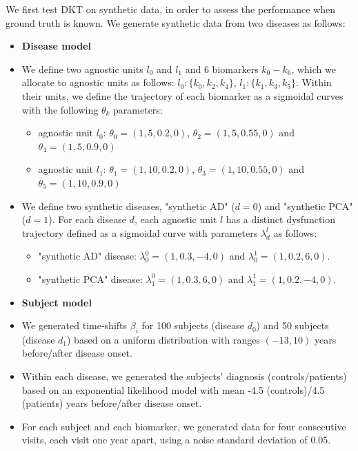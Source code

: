 \documentclass{llncs}
\begin{document}
We first test DKT on synthetic data, in order to assess the performance when ground truth is known. We generate synthetic data from two diseases as follows:
%
\begin{itemize}
 \item[] \textbf{Disease model}
 \item We define two agnostic units $l_0$ and $l_1$ and 6 biomarkers $k_0-k_6$, which we allocate to agnostic units as follows: $l_0:\{k_0, k_2, k_4\}$, $l_1: \{k_1, k_3, k_5\}$. Within their units, we define the trajectory of each biomarker as a sigmoidal curves with the following $\theta_k$ parameters:
 \begin{itemize}
  \item agnostic unit $l_0$: $\theta_0 = (1,5,0.2,0)$, $\theta_2 = (1,5,0.55,0)$ and $\theta_4 = (1,5,0.9,0)$ 
  \item agnostic unit $l_1$: $\theta_1 = (1,10,0.2,0)$, $\theta_3 = (1,10,0.55,0)$ and $\theta_5 = (1,10,0.9,0)$ 
 \end{itemize}
 \item We define two synthetic diseases, "synthetic AD" ($d=0$) and "synthetic PCA" ($d=1$). For each disease $d$, each agnostic unit $l$ has a distinct dysfunction trajectory defined as a sigmoidal curve with parameters $\lambda_d^l$ as follows: 
 \begin{itemize}
  \item "synthetic AD" disease: $\lambda_0^0 = (1, 0.3, -4, 0)$  and $\lambda_0^1 = (1, 0.2, 6, 0)$.
  \item "synthetic PCA" disease: $\lambda_1^0 = (1, 0.3, 6, 0)$ and $\lambda_1^1 = (1, 0.2, -4, 0)$.
 \end{itemize}

 \item[] \textbf{Subject model}
 \item We generated time-shifts $\beta_i$ for 100 subjects (disease $d_0$) and 50 subjects (disease $d_1$) based on a uniform distribution with ranges $(-13, 10)$ years before/after disease onset. 
 \item Within each disease, we generated the subjects' diagnosis (controls/patients) based on an exponential likelihood model with mean -4.5 (controls)/4.5 (patients) years before/after disease onset. 
 \item For each subject and each biomarker, we generated data for four consecutive visits, each visit one year apart, using a noise standard deviation of 0.05.
\end{itemize}
\end{document}
